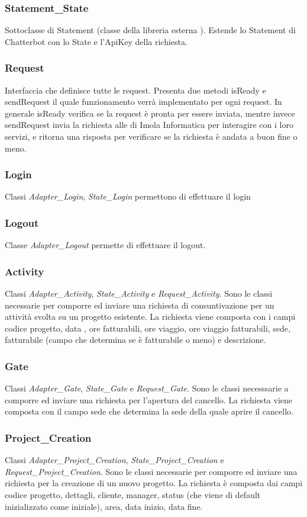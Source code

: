 \subsubsection{Statement\_State} Sottoclasse di Statement (classe della libreria esterna ). Estende lo Statement di Chatterbot con lo State e l'ApiKey della richiesta. 
\subsubsection{Request} Interfaccia che definisce tutte le request. Presenta due metodi isReady e sendRequest il quale funzionamento verrà implementato per ogni request. In generale isReady verifica se la request è pronta per essere inviata, mentre invece sendRequest invia la richiesta  alle  di Imola Informatica per interagire con i loro servizi, e ritorna una risposta per verificare se la richiesta è andata a buon fine o meno.
\subsubsection{Login} Classi \textit{Adapter\_Login}, \textit{State\_Login} permettono di effettuare il login
\subsubsection{Logout} Classe \textit{Adapter\_Logout} permette di effettuare il logout.
\subsubsection{Activity} Classi \textit{Adapter\_Activity}, \textit{State\_Activity} e \textit{Request\_Activity}. Sono le classi necessarie per comporre ed inviare una richiesta di consuntivazione per un attività svolta su un progetto esistente. La richiesta viene composta con i campi codice progetto, data , ore fatturabili, ore viaggio, ore viaggio fatturabili, sede, fatturabile (campo che determina se è fatturabile o meno) e descrizione.
\subsubsection{Gate} Classi \textit{Adapter\_Gate}, \textit{State\_Gate} e \textit{Request\_Gate}. Sono le classi necesssarie a comporre ed inviare una richiesta per l'apertura del cancello. La richiesta viene composta con il campo sede che determina la sede della quale aprire il cancello.
\subsubsection{Project\_Creation} Classi \textit{Adapter\_Project\_Creation}, \textit{State\_Project\_Creation} e \textit{Request\_Project\_Creation}. Sono le classi necessarie per comporre ed inviare una richiesta per la creazione di un nuovo progetto. La richiesta è composta dai campi codice progetto, dettagli, cliente, manager, status (che viene di default inizializzato come iniziale), area, data inizio, data fine.
